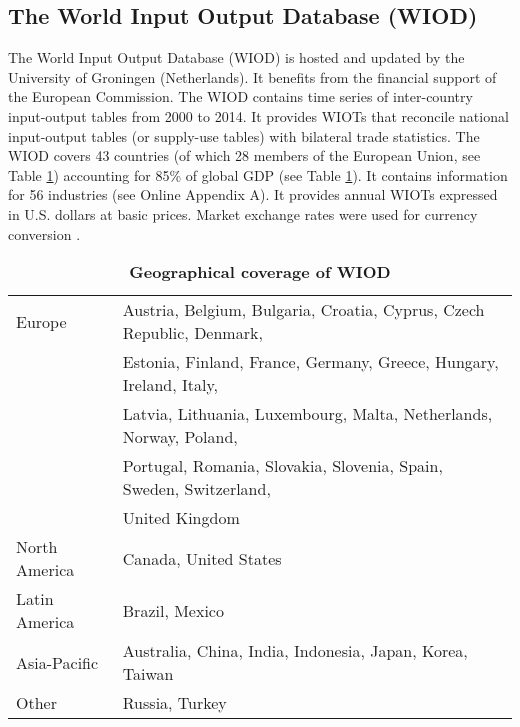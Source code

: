 \documentclass[11pt,a4paper]{paper} %
\begin{document}
\subsection{The World Input Output Database (WIOD)} 
The World Input Output Database (WIOD) is hosted and updated by the University of Groningen (Netherlands). 
It benefits from the financial support of the European Commission. 
The WIOD contains time series of inter-country input-output tables from 2000 to 2014. 
It provides WIOTs that reconcile national input-output tables (or supply-use tables) with bilateral trade statistics.
The WIOD covers 43 countries (of which 28 members of the European Union, see Table \ref{tab:wiod}) accounting for 85\% of global GDP (see Table \ref{tab:wiod}). 
It contains information for 56 industries (see Online Appendix A).
It provides annual WIOTs expressed in U.S. dollars at basic prices. Market exchange rates were used for currency conversion \citep{Timmer2015}. 

 
\begin{table}[!h]
\begin{threeparttable}
\centering
\centering
\caption{\small{\textbf{Geographical coverage of WIOD}}}
\small
\begin{tabular}{ll}
\hline\hline
Europe & Austria, Belgium, Bulgaria, Croatia, Cyprus, Czech Republic, Denmark,\\
& Estonia, Finland, France, Germany, Greece, Hungary, Ireland, Italy,\\
& Latvia, Lithuania, Luxembourg, Malta, Netherlands, Norway, Poland,\\
&Portugal, Romania, Slovakia, Slovenia, Spain, Sweden, Switzerland,\\
& United Kingdom\\
North  America& Canada, United States\\
Latin America & Brazil, Mexico \\
Asia-Pacific & Australia, China, India, Indonesia, Japan, Korea, Taiwan\\
Other & Russia, Turkey\\
\hline\hline
\end{tabular} 
\label{tab:wiod}
\end{threeparttable}
\end{table} 
\end{document}
